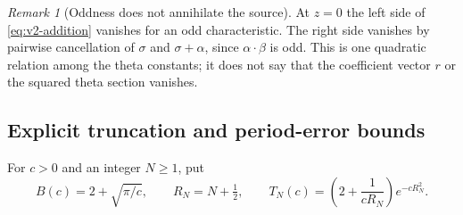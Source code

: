 \documentclass[11pt]{article}
\theoremstyle{definition}
\theoremstyle{remark}
\newtheorem{remark}[remark]{Remark}
\begin{document}
\begin{remark}[Oddness does not annihilate the source]
At $z=0$ the left side of \eqref{eq:v2-addition} vanishes for an odd
characteristic. The right side vanishes by pairwise cancellation of
$\sigma$ and $\sigma+\alpha$, since $\alpha\cdot\beta$ is odd. This is
one quadratic relation among the theta constants; it does not say that the
coefficient vector $r$ or the squared theta section vanishes.
\end{remark}

\subsection{Explicit truncation and period-error bounds}
For $c>0$ and an integer $N\ge1$, put
\begin{equation}
 B(c)=2+\sqrt{\pi/c},\qquad R_N=N+\tfrac12,\qquad
 T_N(c)=\left(2+\frac1{cR_N}\right)e^{-cR_N^2}.
 \label{eq:v2-tail-definitions}
\end{equation}
\end{document}

